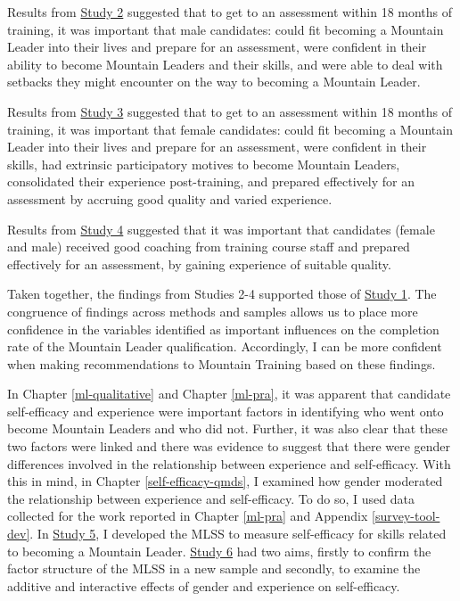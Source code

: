 \documentclass[
  12pt,
  a4paper,
]{book}
\begin{document}
Results from \protect\hyperlink{male-gta}{Study 2} suggested that to get to an assessment within 18 months of training, it was important that male candidates: could fit becoming a Mountain Leader into their lives and prepare for an assessment, were confident in their ability to become Mountain Leaders and their skills, and were able to deal with setbacks they might encounter on the way to becoming a Mountain Leader.

Results from \protect\hyperlink{female-gta}{Study 3} suggested that to get to an assessment within 18 months of training, it was important that female candidates: could fit becoming a Mountain Leader into their lives and prepare for an assessment, were confident in their skills, had extrinsic participatory motives to become Mountain Leaders, consolidated their experience post-training, and prepared effectively for an assessment by accruing good quality and varied experience.

Results from \protect\hyperlink{ftp}{Study 4} suggested that it was important that candidates (female and male) received good coaching from training course staff and prepared effectively for an assessment, by gaining experience of suitable quality.

Taken together, the findings from Studies 2-4 supported those of \protect\hyperlink{ml-qualitative}{Study 1}. The congruence of findings across methods and samples allows us to place more confidence in the variables identified as important influences on the completion rate of the Mountain Leader qualification. Accordingly, I can be more confident when making recommendations to Mountain Training based on these findings.

In Chapter \ref{ml-qualitative} and Chapter \ref{ml-pra}, it was apparent that candidate self-efficacy and experience were important factors in identifying who went onto become Mountain Leaders and who did not. Further, it was also clear that these two factors were linked and there was evidence to suggest that there were gender differences involved in the relationship between experience and self-efficacy. With this in mind, in Chapter \ref{self-efficacy-qmds}, I examined how gender moderated the relationship between experience and self-efficacy. To do so, I used data collected for the work reported in Chapter \ref{ml-pra} and Appendix \ref{survey-tool-dev}. In \href{study-5}{Study 5}, I developed the MLSS to measure self-efficacy for skills related to becoming a Mountain Leader. \href{study-6}{Study 6} had two aims, firstly to confirm the factor structure of the MLSS in a new sample and secondly, to examine the additive and interactive effects of gender and experience on self-efficacy.
\end{document}
